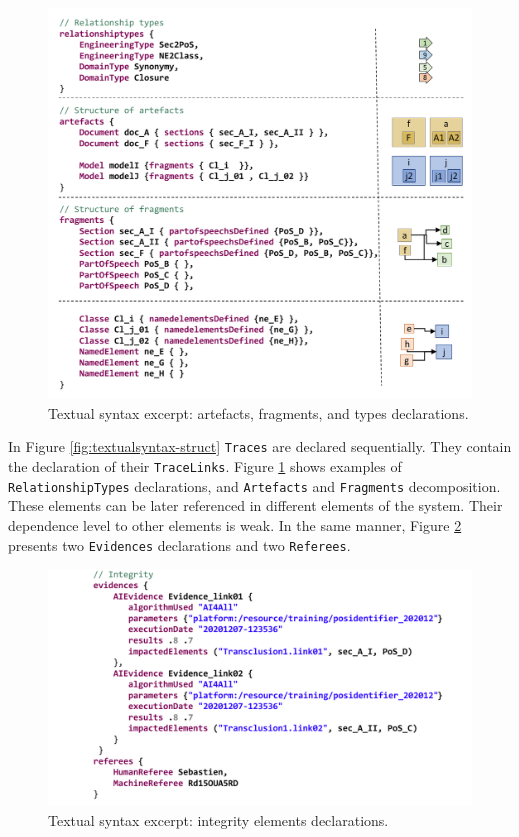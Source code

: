 \begin{figure}[h]
	\centering 
	\includegraphics[width=.9\linewidth]{images/listing-art-n-types.pdf}
	\caption{Textual syntax excerpt: artefacts, fragments, and types declarations.}
	\label{fig:textualsyntax-declare}
\end{figure}
In Figure \ref{fig:textualsyntax-struct} \texttt{Traces} are declared sequentially. They contain the declaration of their \texttt{TraceLinks}. Figure \ref{fig:textualsyntax-declare} shows examples of \texttt{RelationshipTypes} declarations, and \texttt{Artefacts} and \texttt{Fragments} decomposition. These elements can be later referenced in different elements of the system. Their dependence level to other elements is weak. In the same manner, Figure \ref{fig:textualsyntax-integrity} presents two \texttt{Evidences} declarations and two \texttt{Referees}.

\begin{figure}[h]
	\centering 
	\includegraphics[width=.9\linewidth]{images/listing-integrity.pdf}
	\caption{Textual syntax excerpt: integrity elements declarations.}
	\label{fig:textualsyntax-integrity}
\end{figure}
